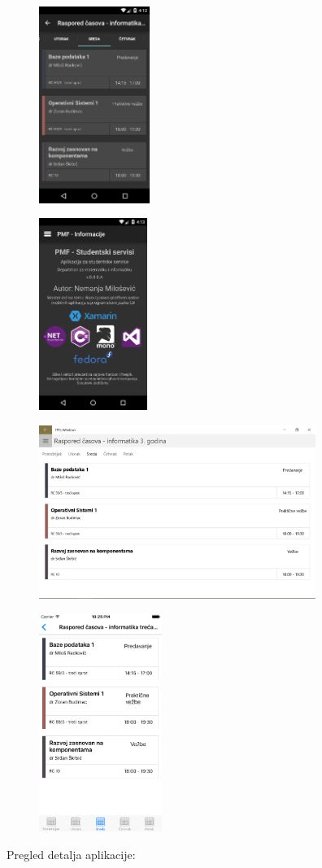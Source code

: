\documentclass[a4paper]{article}
\begin{document}
\begin{figure}
\centering
\includegraphics[width=36.02mm,height=63.98mm]{msc-img25.png}
\end{figure}
\begin{figure}
\centering
\includegraphics[width=35.14mm,height=62.42mm]{msc-img26.png}
\end{figure}
\begin{figure}
\centering
\includegraphics[width=90.1mm,height=56.3mm]{msc-img27.png}
\end{figure}


\begin{figure}
\centering
\includegraphics[width=39.92mm,height=70.96mm]{msc-img28.png}
\end{figure}
Pregled detalja aplikacije: 
\end{document}

